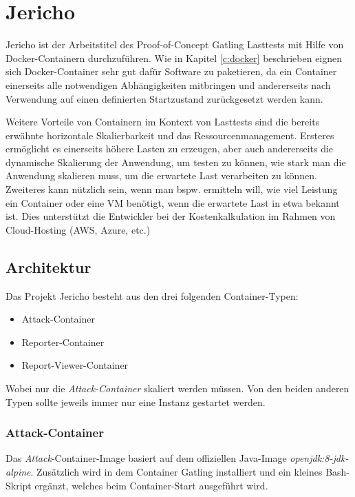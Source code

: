 \chapter{Jericho}

Jericho ist der Arbeitstitel des Proof-of-Concept Gatling Lasttests mit Hilfe von Docker-Containern durchzuführen.
Wie in Kapitel \ref{c:docker} beschrieben eignen sich Docker-Container sehr gut dafür Software zu paketieren, da ein Container einerseits alle notwendigen Abhängigkeiten mitbringen und andererseits nach Verwendung auf einen definierten Startzustand zurückgesetzt werden kann.

Weitere Vorteile von Containern im Kontext von Lasttests sind die bereits erwähnte horizontale Skalierbarkeit und das Ressourcenmanagement.
Ersteres ermöglicht es einerseits höhere Lasten zu erzeugen, aber auch andererseits die dynamische Skalierung der Anwendung, um testen zu können, wie stark man die Anwendung skalieren muss, um die erwartete Last verarbeiten zu können.
Zweiteres kann nützlich sein, wenn man bspw. ermitteln will, wie viel Leistung ein Container oder eine \ac{VM} benötigt, wenn die erwartete Last in etwa bekannt ist.
Dies unterstützt die Entwickler bei der Kostenkalkulation im Rahmen von Cloud-Hosting (AWS, Azure, etc.)

\section{Architektur}

Das Projekt Jericho besteht aus den drei folgenden Container-Typen:

\begin{itemize}
	\item Attack-Container
	\item Reporter-Container
	\item Report-Viewer-Container
\end{itemize}

Wobei nur die \textit{Attack-Container} skaliert werden müssen.
Von den beiden anderen Typen sollte jeweils immer nur eine Instanz gestartet werden.

\subsection{Attack-Container}

Das \textit{Attack}-Container-Image basiert auf dem offiziellen Java-Image \textit{openjdk:8-jdk-alpine}.
Zusätzlich wird in dem Container Gatling installiert und ein kleines Bash-Skript ergänzt, welches beim Container-Start ausgeführt wird.

